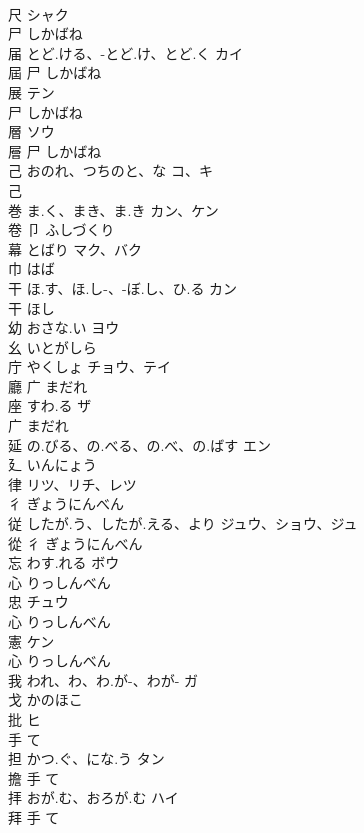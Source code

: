 \documentclass[8pt]{extreport}
\begin{document}
\begin{CJK}{UTF8}{min}
\\	尺		シャク	
\\	尸		しかばね		
\\	届	とど.ける、-とど.け、とど.く	カイ	
\\	屆	尸		しかばね		
\\	展		テン	
\\	尸		しかばね		
\\	層		ソウ	
\\	層	尸		しかばね		
\\	己	おのれ、つちのと、な	コ、キ	
\\	己				
\\	巻	ま.く、まき、ま.き	カン、ケン	
\\	卷	卩		ふしづくり		
\\	幕	とばり	マク、バク	
\\	巾		はば		
\\	干	ほ.す、ほ.し-、-ぼ.し、ひ.る	カン	
\\	干		ほし		
\\	幼	おさな.い	ヨウ	
\\	幺		いとがしら		
\\	庁	やくしょ	チョウ、テイ	
\\	廳	广		まだれ		
\\	座	すわ.る	ザ	
\\	广		まだれ		
\\	延	の.びる、の.べる、の.べ、の.ばす	エン	
\\	廴		いんにょう		
\\	律		リツ、リチ、レツ	
\\	彳		ぎょうにんべん		
\\	従	したが.う、したが.える、より	ジュウ、ショウ、ジュ	
\\	從	彳		ぎょうにんべん		
\\	忘	わす.れる	ボウ	
\\	心		りっしんべん		
\\	忠		チュウ	
\\	心		りっしんべん		
\\	憲		ケン	
\\	心		りっしんべん		
\\	我	われ、わ、わ.が-、わが-	ガ	
\\	戈		かのほこ		
\\	批		ヒ	
\\	手		て		
\\	担	かつ.ぐ、にな.う	タン	
\\	擔	手		て		
\\	拝	おが.む、おろが.む	ハイ	
\\	拜	手		て		

\end{CJK}
\end{document}
